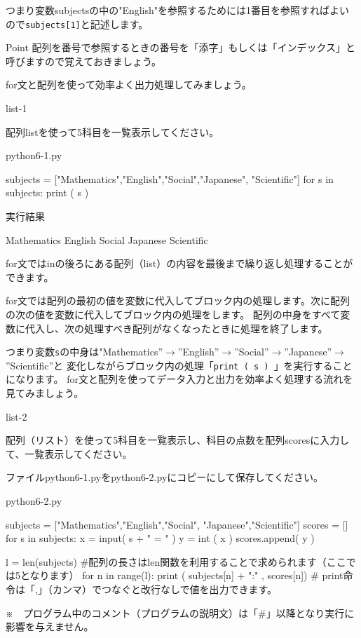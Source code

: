 \documentclass[11pt,a4paper,dvipdfmx,titlepage]{jsreport}
\begin{document}
つまり変数subjectsの中の"English"を参照するためには1番目を参照すればよいので{\tt subjects[1]}と記述します。

\begin{hipoint}{Point}
配列を番号で参照するときの番号を「添字」もしくは「インデックス」と呼びますので覚えておきましょう。
\end{hipoint}
for文と配列を使って効率よく出力処理してみましょう。

\begin{pabox}{list-1}

配列listを使って5科目を一覧表示してください。


\begin{legbox}{python6-1.py}
\begin{listing}{1}
subjects = ["Mathematics","English","Social","Japanese",
"Scientific"]
for s in subjects:
    print ( s )
\end{listing}
実行結果
\begin{listing}{1}
Mathematics
English
Social
Japanese
Scientific
\end{listing}
\end{legbox}
for文ではinの後ろにある配列（list）の内容を最後まで繰り返し処理することができます。
\end{pabox}
for文では配列の最初の値を変数に代入してブロック内の処理します。次に配列の次の値を変数に代入してブロック内の処理をします。
配列の中身をすべて変数に代入し、次の処理すべき配列がなくなったときに処理を終了します。

つまり変数{\tt s}の中身は"Mathematics”$\rightarrow$”English”$\rightarrow$”Social”$\rightarrow$”Japanese”$\rightarrow$”Scientific”と
変化しながらブロック内の処理「{\tt print ( s ) }」を実行することになります。
\newpage
for文と配列を使ってデータ入力と出力を効率よく処理する流れを見てみましょう。
\begin{pabox}{list-2}

配列（リスト）を使って5科目を一覧表示し、科目の点数を配列scoresに入力して、一覧表示してください。

ファイルpython6-1.pyをpython6-2.pyにコピーにして保存してください。
\begin{legbox}{python6-2.py}
\begin{listing}{1}
subjects = ["Mathematics","English","Social",
    "Japanese","Scientific"]
scores = [] 
for s in subjects:
    x = input( s + " = " )
    y = int ( x )
    scores.append( y )

l = len(subjects)
#配列の長さはlen関数を利用することで求められます（ここでは5となります）
for n in range(l):
    print ( subjects[n] + ":" , scores[n])
# print命令は「,」（カンマ）でつなぐと改行なしで値を出力できます。
\end{listing}
\end{legbox}

※　プログラム中のコメント（プログラムの説明文）は「\#」以降となり実行に影響を与えません。
\end{pabox}
\end{document}
